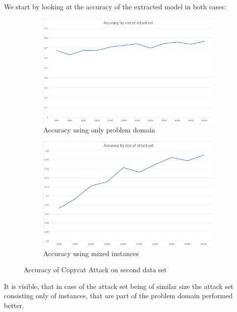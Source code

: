 \documentclass[a4paper,11pt]{article}
\begin{document}
        We start by looking at the accuracy of the extracted model in both cases:
            \begin{figure}[h!]
            \centering
            \begin{subfigure}[c]{0.49\textwidth}
                \centering
                \includegraphics[width=1\textwidth]{exercise_3/paper/images/Accuracy_copy_cat_domain.png}
                \caption{Accuracy using only problem domain}
                \label{fig:Accuracy_Cat_domain}
            \end{subfigure}
            \begin{subfigure}[c]{0.49\textwidth}
                \centering
                \includegraphics[width=1\textwidth]{exercise_3/paper/images/Accuracy_copy_cat.png}
                \caption{Accuracy using mixed instances }
                \label{fig:Accuracy_cat_mix}
            \end{subfigure}
            \caption{Accuracy of Copycat Attack on second data set}
            \label{fig:accuracy_cat}
        \end{figure}
        It is visible, that in case of the attack set being of similar size the attack set consisting only of instances, that are part of the problem domain performed better. 
\end{document}
